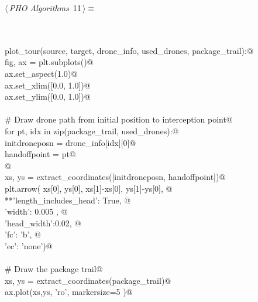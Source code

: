\documentclass[12.0pt]{report}
\begin{document}
\begin{flushleft} \small
\begin{minipage}{\linewidth}\label{scrap6}\raggedright\small
{} $\langle\,${\itshape PHO Algorithms}\nobreak\ {\footnotesize {11}}$\,\rangle\equiv$
\vspace{-1ex}
\begin{list}{}{} \item
\mbox{}\verb@@\\
\mbox{}\verb@@\\
\mbox{}\verb@def plot_tour(source, target, drone_info, used_drones, package_trail):@\\
\mbox{}\verb@    fig, ax = plt.subplots()@\\
\mbox{}\verb@    ax.set_aspect(1.0)@\\
\mbox{}\verb@    ax.set_xlim([0.0, 1.0])@\\
\mbox{}\verb@    ax.set_ylim([0.0, 1.0])@\\
\mbox{}\verb@@\\
\mbox{}\verb@    # Draw drone path from initial position to interception point@\\
\mbox{}\verb@    for pt, idx in zip(package_trail, used_drones):@\\
\mbox{}\verb@         initdroneposn = drone_info[idx][0]@\\
\mbox{}\verb@         handoffpoint  = pt@\\
\mbox{}\verb@    @\\
\mbox{}\verb@         xs, ys = extract_coordinates([initdroneposn, handoffpoint])@\\
\mbox{}\verb@         plt.arrow( xs[0], ys[0], xs[1]-xs[0], ys[1]-ys[0], @\\
\mbox{}\verb@                    **{'length_includes_head': True, @\\
\mbox{}\verb@                       'width': 0.005 , @\\
\mbox{}\verb@                       'head_width':0.02, @\\
\mbox{}\verb@                       'fc': 'b', @\\
\mbox{}\verb@                       'ec': 'none'})@\\
\mbox{}\verb@@\\
\mbox{}\verb@    # Draw the package trail@\\
\mbox{}\verb@    xs, ys = extract_coordinates(package_trail)@\\
\mbox{}\verb@    ax.plot(xs,ys, 'ro', markersize=5 )@\\

\end{list}
\end{minipage}
\end{flushleft}
\end{document}
